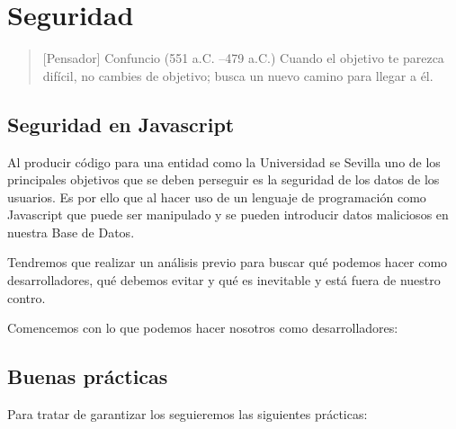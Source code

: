 \chapter{Seguridad}

\begin{quotation} [Pensador] {Confuncio (551 a.C. --479 a.C.)}
Cuando el objetivo te parezca difícil, no cambies de objetivo; busca un nuevo camino para llegar a él.
\end{quotation}

\begin{abstract}
En un mundo completamente digitalizado como en el que vivimos nuestros datos se vuelve un bien que muchos podrían querer vulnerar por lo que la seguridad se vuelve un elemento primordial en cualquier servicio.
\end{abstract}


\newpage
\section{Seguridad en Javascript}

Al producir código para una entidad como la Universidad se Sevilla uno de los principales objetivos que se deben perseguir es la seguridad de los datos de los usuarios. Es por ello que al hacer uso de un lenguaje de programación como Javascript que puede ser manipulado y se pueden introducir datos maliciosos en nuestra Base de Datos.

Tendremos que realizar un análisis previo para buscar qué podemos hacer como desarrolladores, qué debemos evitar y qué es inevitable y está fuera de nuestro contro.

Comencemos con lo que podemos hacer nosotros como desarrolladores:

\section{Buenas prácticas}

Para tratar de garantizar los seguieremos las siguientes prácticas:

